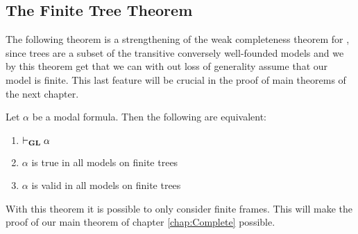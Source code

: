 \documentclass[../main.tex]{subfiles}
\begin{document}
\subsection{The Finite Tree Theorem}
The following theorem is a strengthening of the weak completeness theorem for
\GL, since trees are a subset of the transitive conversely well-founded models
and we by this theorem get that we can with out loss of generality assume that
our model is finite. This last feature will be crucial in the proof of main
theorems of the next chapter.
\begin{thm}
	Let $\alpha$ be a modal formula. Then the following are equivalent:
	\begin{enumerate}
		\item $\vdash_{\text{\textbf{GL}}}\alpha$
		\item $\alpha$ is true in all models on finite trees
		\item $\alpha$ is valid in all models on finite trees
	\end{enumerate}
\end{thm}
With this theorem it is possible to only consider finite frames. This will make
the proof of our main theorem of chapter \ref{chap:Complete} possible.
\end{document}
